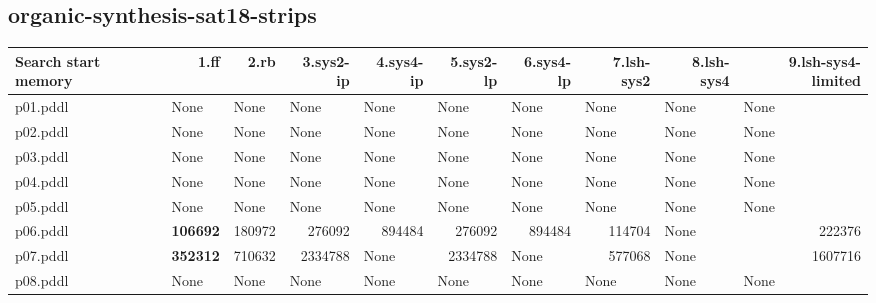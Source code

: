 \documentclass{article}
\begin{document}
\hypertarget{search_start_memory-organic-synthesis-sat18-strips}{}
\subsection*{organic-synthesis-sat18-strips}

\begin{tabular}{@{}lrrrrrrrrr@{}}
Search start memory & 1.ff & 2.rb & 3.sys2-ip & 4.sys4-ip & 5.sys2-lp & 6.sys4-lp & 7.lsh-sys2 & 8.lsh-sys4 & 9.lsh-sys4-limited \\
\midrule
p01.pddl & \multicolumn{1}{|l|}{None} & \multicolumn{1}{|l|}{None} & \multicolumn{1}{|l|}{None} & \multicolumn{1}{|l|}{None} & \multicolumn{1}{|l|}{None} & \multicolumn{1}{|l|}{None} & \multicolumn{1}{|l|}{None} & \multicolumn{1}{|l|}{None} & \multicolumn{1}{|l|}{None} \\
p02.pddl & \multicolumn{1}{|l|}{None} & \multicolumn{1}{|l|}{None} & \multicolumn{1}{|l|}{None} & \multicolumn{1}{|l|}{None} & \multicolumn{1}{|l|}{None} & \multicolumn{1}{|l|}{None} & \multicolumn{1}{|l|}{None} & \multicolumn{1}{|l|}{None} & \multicolumn{1}{|l|}{None} \\
p03.pddl & \multicolumn{1}{|l|}{None} & \multicolumn{1}{|l|}{None} & \multicolumn{1}{|l|}{None} & \multicolumn{1}{|l|}{None} & \multicolumn{1}{|l|}{None} & \multicolumn{1}{|l|}{None} & \multicolumn{1}{|l|}{None} & \multicolumn{1}{|l|}{None} & \multicolumn{1}{|l|}{None} \\
p04.pddl & \multicolumn{1}{|l|}{None} & \multicolumn{1}{|l|}{None} & \multicolumn{1}{|l|}{None} & \multicolumn{1}{|l|}{None} & \multicolumn{1}{|l|}{None} & \multicolumn{1}{|l|}{None} & \multicolumn{1}{|l|}{None} & \multicolumn{1}{|l|}{None} & \multicolumn{1}{|l|}{None} \\
p05.pddl & \multicolumn{1}{|l|}{None} & \multicolumn{1}{|l|}{None} & \multicolumn{1}{|l|}{None} & \multicolumn{1}{|l|}{None} & \multicolumn{1}{|l|}{None} & \multicolumn{1}{|l|}{None} & \multicolumn{1}{|l|}{None} & \multicolumn{1}{|l|}{None} & \multicolumn{1}{|l|}{None} \\
p06.pddl & \textbf{106692} & 180972 & 276092 & 894484 & 276092 & 894484 & 114704 & \multicolumn{1}{|l|}{None} & 222376 \\
p07.pddl & \textbf{352312} & 710632 & 2334788 & \multicolumn{1}{|l|}{None} & 2334788 & \multicolumn{1}{|l|}{None} & 577068 & \multicolumn{1}{|l|}{None} & 1607716 \\
p08.pddl & \multicolumn{1}{|l|}{None} & \multicolumn{1}{|l|}{None} & \multicolumn{1}{|l|}{None} & \multicolumn{1}{|l|}{None} & \multicolumn{1}{|l|}{None} & \multicolumn{1}{|l|}{None} & \multicolumn{1}{|l|}{None} & \multicolumn{1}{|l|}{None} & \multicolumn{1}{|l|}{None} \\

\end{tabular}
\end{document}
